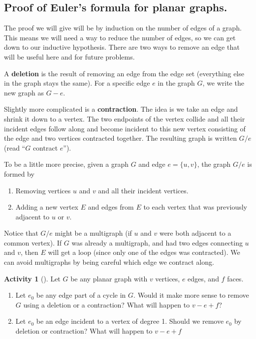 \documentclass[10pt,]{book}
\newcommand{\terminology}[1]{\textbf{#1}}
\theoremstyle{plain}
\theoremstyle{definition}
\theoremstyle{definition}
\theoremstyle{definition}
\newtheorem{activity}[project]{Activity}
\numberwithin{equation}{chapter}
\begin{document}
\subsection[{Proof of Euler's formula for planar graphs.}]{Proof of Euler's formula for planar graphs.}\label{subsection-6}
\hypertarget{p-249}{}%
The proof we will give will be by induction on the number of edges of a graph.  This means we will need a way to reduce the number of edges, so we can get down to our inductive hypothesis.  There are two ways to remove an edge that will be useful here and for future problems.%
\par
\hypertarget{p-250}{}%
 A \terminology{deletion} is the result of removing an edge from the edge set (everything else in the graph stays the same).  For a specific edge \(e\) in the graph \(G\), we write the new graph as \(G - e\).%
\par
\hypertarget{p-251}{}%
 Slightly more complicated is a \terminology{contraction}.  The idea is we take an edge and shrink it down to a vertex.  The two endpoints of the vertex collide and all their incident edges follow along and become incident to this new vertex consisting of the edge and two vertices contracted together.  The resulting graph is written \(G/e\) (read ``\(G\) contract \(e\)'').%
\par
\hypertarget{p-252}{}%
To be a little more precise, given a graph \(G\) and edge \(e = \{u,v\}\), the graph \(G/e\) is formed by \leavevmode%
\begin{enumerate}
\item\hypertarget{li-33}{}\hypertarget{p-253}{}%
Removing vertices \(u\) and \(v\) and all their incident vertices.%
\item\hypertarget{li-34}{}\hypertarget{p-254}{}%
Adding a new vertex \(E\) and edges from \(E\) to each vertex that was previously adjacent to \(u\) or \(v\).%
\end{enumerate}
 Notice that \(G/e\) might be a multigraph (if \(u\) and \(v\) were both adjacent to a common vertex).  If \(G\) was already a multigraph, and had two edges connecting \(u\) and \(v\), then \(E\) will get a loop (since only one of the edges was contracted).  We can avoid multigraphs by being careful which edge we contract along.%
\begin{activity}[]\label{activity-19}
\hypertarget{p-255}{}%
Let \(G\) be any planar graph with \(v\) vertices, \(e\) edges, and \(f\) faces.%
\begin{enumerate}[font=\bfseries,label=(\alph*),ref=\alph*]
\item\label{task-29} \hypertarget{p-256}{}%
Let \(e_0\) be any edge part of a cycle in \(G\).  Would it make more sense to remove \(G\) using a deletion or a contraction?  What will happen to \(v - e + f\)?%
\item\label{task-30} \hypertarget{p-257}{}%
Let \(e_0\) be an edge incident to a vertex of degree 1.  Should we remove \(e_0\) by deletion or contraction?  What will happen to \(v- e + f\)%
\end{enumerate}
\end{activity}
\end{document}
